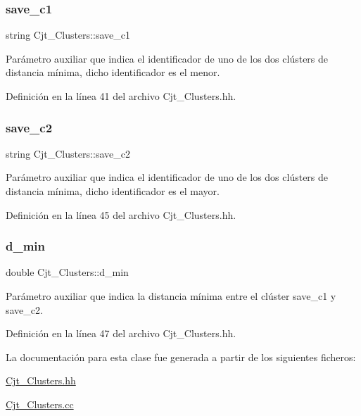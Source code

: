 \subsubsection{\texorpdfstring{save\+\_\+c1}{save\_c1}}
{\footnotesize\ttfamily string Cjt\+\_\+\+Clusters\+::save\+\_\+c1\hspace{0.3cm}{\ttfamily [private]}}



Parámetro auxiliar que indica el identificador de uno de los dos clústers de distancia mínima, dicho identificador es el menor. 



Definición en la línea 41 del archivo Cjt\+\_\+\+Clusters.\+hh.

\mbox{\label{class_cjt___clusters_a1406c60345958da0016fa3c0b1cd89f5}} 
\subsubsection{\texorpdfstring{save\+\_\+c2}{save\_c2}}
{\footnotesize\ttfamily string Cjt\+\_\+\+Clusters\+::save\+\_\+c2\hspace{0.3cm}{\ttfamily [private]}}



Parámetro auxiliar que indica el identificador de uno de los dos clústers de distancia mínima, dicho identificador es el mayor. 



Definición en la línea 45 del archivo Cjt\+\_\+\+Clusters.\+hh.

\mbox{\label{class_cjt___clusters_a1b94b5f25778ee95796a9be966f1c619}} 
\subsubsection{\texorpdfstring{d\+\_\+min}{d\_min}}
{\footnotesize\ttfamily double Cjt\+\_\+\+Clusters\+::d\+\_\+min\hspace{0.3cm}{\ttfamily [private]}}



Parámetro auxiliar que indica la distancia mínima entre el clúster save\+\_\+c1 y save\+\_\+c2. 



Definición en la línea 47 del archivo Cjt\+\_\+\+Clusters.\+hh.



La documentación para esta clase fue generada a partir de los siguientes ficheros\+:\begin{DoxyCompactItemize}
\item 
\hyperlink{_cjt___clusters_8hh}{Cjt\+\_\+\+Clusters.\+hh}\item 
\hyperlink{_cjt___clusters_8cc}{Cjt\+\_\+\+Clusters.\+cc}\end{DoxyCompactItemize}

